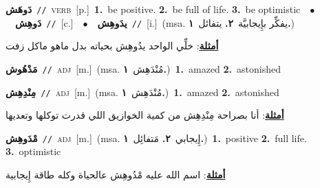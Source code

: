 \documentclass[10pt,a4paper,twoside]{article} %
\begin{document}
\begin{multicols}{2}
{\setlength\topsep{0pt}\textbf{\foreignlanguage{arabic}{دَوهَش}}\ {\color{gray}\texttt{//}\color{black}}\ \textsc{verb}\ [p.]\ \textbf{1.}~be positive.  \textbf{2.}~be full of life.  \textbf{3.}~be optimistic\ \ $\bullet$\ \ \setlength\topsep{0pt}\textbf{\foreignlanguage{arabic}{دَوهِش}}\ {\color{gray}\texttt{//}\color{black}}\ [c.]\ \ $\bullet$\ \ \setlength\topsep{0pt}\textbf{\foreignlanguage{arabic}{يدَوهِش}}\ {\color{gray}\texttt{//}\color{black}}\ [i.]\ \color{gray}(msa. \foreignlanguage{arabic}{يفكِّر بإِيجابيَّة}~\foreignlanguage{arabic}{\textbf{٢.}}  \foreignlanguage{arabic}{يتفائل}~\foreignlanguage{arabic}{\textbf{١.}})\color{black}\  \begin{flushright}\color{gray}\foreignlanguage{arabic}{\textbf{\underline{\foreignlanguage{arabic}{أمثلة}}}: خلِّي الواحد يدُوهِش بحياته بدل ماهو ماكل زفت}\end{flushright}\color{black}} \vspace{2mm}

{\setlength\topsep{0pt}\textbf{\foreignlanguage{arabic}{مَدْهُوش}}\ {\color{gray}\texttt{//}\color{black}}\ \textsc{adj}\ [m.]\ \color{gray}(msa. \foreignlanguage{arabic}{مُنْدَهِش}~\foreignlanguage{arabic}{\textbf{١.}})\color{black}\ \textbf{1.}~amazed  \textbf{2.}~astonished\ } \vspace{2mm}

{\setlength\topsep{0pt}\textbf{\foreignlanguage{arabic}{مِنْدِهِش}}\ {\color{gray}\texttt{//}\color{black}}\ \textsc{adj}\ [m.]\ \color{gray}(msa. \foreignlanguage{arabic}{مُنْدَهِش}~\foreignlanguage{arabic}{\textbf{١.}})\color{black}\ \textbf{1.}~amazed  \textbf{2.}~astonished\  \begin{flushright}\color{gray}\foreignlanguage{arabic}{\textbf{\underline{\foreignlanguage{arabic}{أمثلة}}}: أنا بصراحة مِنْدِهِش من كمية الخوازيق اللي قدرت توكلها وتعديها}\end{flushright}\color{black}} \vspace{2mm}

{\setlength\topsep{0pt}\textbf{\foreignlanguage{arabic}{مْدَوهِش}}\ {\color{gray}\texttt{//}\color{black}}\ \textsc{adj}\ [m.]\ \color{gray}(msa. \foreignlanguage{arabic}{إِيجابي}~\foreignlanguage{arabic}{\textbf{٢.}}  \foreignlanguage{arabic}{مَتفائِل}~\foreignlanguage{arabic}{\textbf{١.}})\color{black}\ \textbf{1.}~positive  \textbf{2.}~full life.  \textbf{3.}~optimistic\  \begin{flushright}\color{gray}\foreignlanguage{arabic}{\textbf{\underline{\foreignlanguage{arabic}{أمثلة}}}: اسم الله عليه مْدُوهِش عالحياة وكله طاقة إِيجابية}\end{flushright}\color{black}} \vspace{2mm}


\end{multicols}
\end{document}
